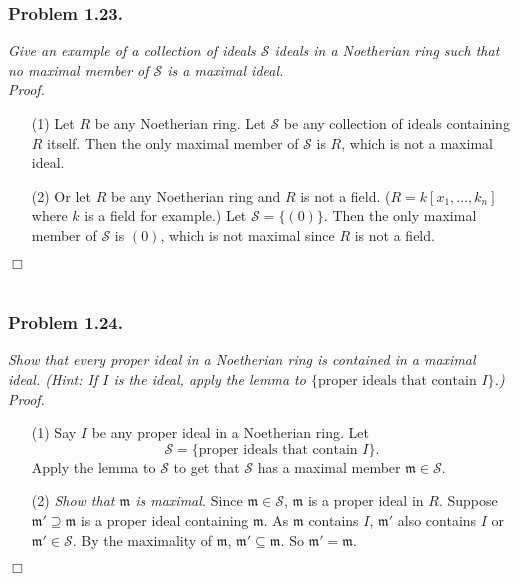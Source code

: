 \documentclass{article}
\begin{document}
\subsubsection*{Problem 1.23.}
\emph{Give an example of a collection of ideals $\mathscr{S}$ ideals in a Noetherian ring
such that no maximal member of $\mathscr{S}$ is a maximal ideal.} \\

\emph{Proof.}
\begin{enumerate}
\item[(1)]
  Let $R$ be any Noetherian ring.
  Let $\mathscr{S}$ be any collection of ideals containing $R$ itself.
  Then the only maximal member of $\mathscr{S}$ is $R$, which is not a maximal ideal.

\item[(2)]
  Or let $R$ be any Noetherian ring and $R$ is not a field.
  ($R = k[x_1,\ldots,k_n]$ where $k$ is a field for example.)
  Let $\mathscr{S} = \{ (0) \}$.
  Then the only maximal member of $\mathscr{S}$ is $(0)$, which is not maximal
  since $R$ is not a field.
\end{enumerate}
$\Box$ \\\\






\subsubsection*{Problem 1.24.}
\emph{Show that every proper ideal in a Noetherian ring is contained in a maximal ideal.
(Hint: If $I$ is the ideal, apply the lemma to $\{\text{proper ideals that contain $I$}\}$.)} \\

\emph{Proof.}
\begin{enumerate}
\item[(1)]
  Say $I$ be any proper ideal in a Noetherian ring.
  Let
  \[
    \mathscr{S} = \{\text{proper ideals that contain $I$}\}.
  \]
  Apply the lemma to $\mathscr{S}$ to get that
  $\mathscr{S}$ has a maximal member $\mathfrak{m} \in \mathscr{S}$.

\item[(2)]
  \emph{Show that $\mathfrak{m}$ is maximal.}
  Since $\mathfrak{m} \in \mathscr{S}$, $\mathfrak{m}$ is a proper ideal in $R$.
  Suppose $\mathfrak{m}' \supseteq \mathfrak{m}$
  is a proper ideal containing $\mathfrak{m}$.
  As $\mathfrak{m}$ contains $I$,
  $\mathfrak{m}'$ also contains $I$ or $\mathfrak{m}' \in \mathscr{S}$.
  By the maximality of $\mathfrak{m}$, $\mathfrak{m}' \subseteq \mathfrak{m}$.
  So $\mathfrak{m}' = \mathfrak{m}$.
\end{enumerate}
$\Box$ \\\\
\end{document}
